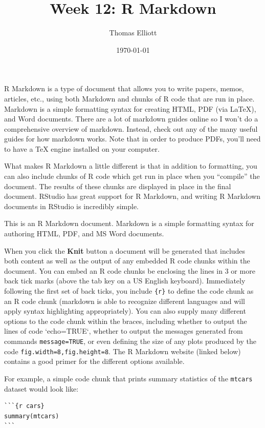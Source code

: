 \documentclass[12pt, oneside]{amsart}   	%
\title{Week 12: R Markdown}
\author{Thomas Elliott}
\date{\today}							%
\begin{document}
\maketitle


R Markdown is a type of document that allows you to write papers, memos, articles, etc., using both Markdown and chunks of R code that are run in place. Markdown is a simple formatting syntax for creating HTML, PDF (via \LaTeX), and Word documents. There are a lot of markdown guides online so I won't do a comprehensive overview of markdown. Instead, check out any of the many useful guides for how markdown works. Note that in order to produce PDFs, you'll need to have a TeX engine installed on your computer.

What makes R Markdown a little different is that in addition to formatting, you can also include chunks of R code which get run in place when you ``compile'' the document. The results of these chunks are displayed in place in the final document. RStudio has great support for R Markdown, and writing R Markdown documents in RStudio is incredibly simple.

This is an R Markdown document. Markdown is a simple formatting syntax for authoring HTML, PDF, and MS Word documents. 

When you click the \textbf{Knit} button a document will be generated that includes both content as well as the output of any embedded R code chunks within the document. You can embed an R code chunks be enclosing the lines in 3 or more back tick marks (above the tab key on a US English keyboard). Immediately following the first set of back ticks, you include \texttt{\{r\}} to define the code chunk as an R code chunk (markdown is able to recognize different languages and will apply syntax highlighting appropriately). You can also supply many different options to the code chunk within the braces, including whether to output the lines of code `echo=TRUE`, whether to output the messages generated from commands \texttt{message=TRUE}, or even defining the size of any plots produced by the code \texttt{fig.width=8,fig.height=8}. The R Markdown website (linked below) contains a good primer for the different options available. 

For example, a simple code chunk that prints summary statistics of the \texttt{mtcars} dataset would look like:

\begin{verbatim}
```{r cars}
summary(mtcars)
```
\end{verbatim}
\end{document}
